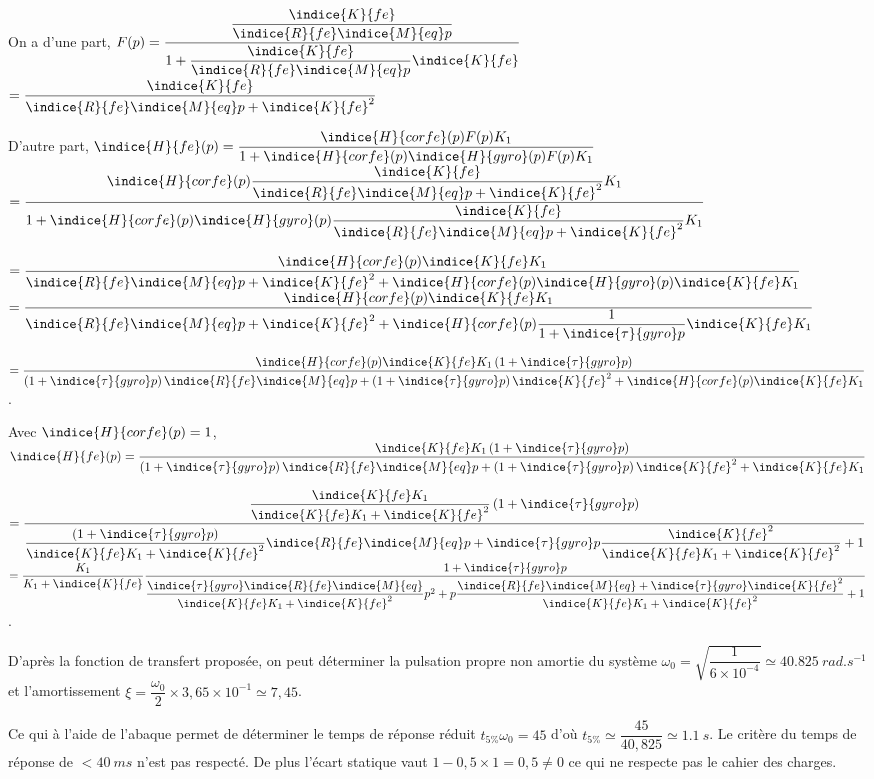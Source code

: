 \question{}
\ifprof
\begin{corrige}
On a d'une part, 
$F(p) = \dfrac{\dfrac{\indice{K}{fe}}{\indice{R}{fe}\indice{M}{eq}p}}{1+\dfrac{\indice{K}{fe}}{\indice{R}{fe}\indice{M}{eq}p}\indice{K}{fe}}$
$= \dfrac{\indice{K}{fe}}{\indice{R}{fe}\indice{M}{eq}p+ \indice{K}{fe}^2}$


D'autre part, 
$\indice{H}{fe} (p)= \dfrac{\indice{H}{corfe}(p) F(p) K_1 }{1+\indice{H}{corfe}(p)\indice{H}{gyro}(p) F(p) K_1 }$
$ = \dfrac{\indice{H}{corfe}(p) \dfrac{\indice{K}{fe}}{\indice{R}{fe}\indice{M}{eq}p+ \indice{K}{fe}^2} K_1 }{1+\indice{H}{corfe}(p)\indice{H}{gyro}(p) \dfrac{\indice{K}{fe}}{\indice{R}{fe}\indice{M}{eq}p+ \indice{K}{fe}^2} K_1 }$ 


$ = \dfrac{\indice{H}{corfe}(p) \indice{K}{fe} K_1 }{\indice{R}{fe}\indice{M}{eq}p+ \indice{K}{fe}^2+\indice{H}{corfe}(p)\indice{H}{gyro}(p) \indice{K}{fe} K_1} $ 
$ = \dfrac{\indice{H}{corfe}(p) \indice{K}{fe} K_1 }{\indice{R}{fe}\indice{M}{eq}p+ \indice{K}{fe}^2+\indice{H}{corfe}(p)\dfrac{1}{1+\indice{\tau}{gyro}p}\indice{K}{fe} K_1} $ 

$ = \dfrac{\indice{H}{corfe}(p) \indice{K}{fe} K_1 \left(1+\indice{\tau}{gyro}p\right)}{ \left(1+\indice{\tau}{gyro}p\right) \indice{R}{fe}\indice{M}{eq}p+  \left(1+\indice{\tau}{gyro}p\right) \indice{K}{fe}^2+\indice{H}{corfe}(p)\indice{K}{fe} K_1} $.

Avec $\indice{H}{corfe}(p) = 1$, 
$ \indice{H}{fe} (p) = \dfrac{ \indice{K}{fe} K_1 \left(1+\indice{\tau}{gyro}p\right)}{ \left(1+\indice{\tau}{gyro}p\right) \indice{R}{fe}\indice{M}{eq}p+  \left(1+\indice{\tau}{gyro}p\right) \indice{K}{fe}^2+\indice{K}{fe} K_1} $ 

$ = \dfrac{ \dfrac{\indice{K}{fe} K_1}{\indice{K}{fe} K_1+\indice{K}{fe}^2} \left(1+\indice{\tau}{gyro}p\right)}{ \dfrac{\left(1+\indice{\tau}{gyro}p\right)}{\indice{K}{fe} K_1+\indice{K}{fe}^2} \indice{R}{fe}\indice{M}{eq}p+  \indice{\tau}{gyro}p\dfrac{ \indice{K}{fe}^2}{\indice{K}{fe} K_1+\indice{K}{fe}^2}+1} $ 
$ = \dfrac{ K_1}{ K_1+\indice{K}{fe}} \dfrac{ 1+\indice{\tau}{gyro}p}{ \dfrac{\indice{\tau}{gyro} \indice{R}{fe}\indice{M}{eq} }{\indice{K}{fe} K_1+\indice{K}{fe}^2} p^2+  p\dfrac{ \indice{R}{fe}\indice{M}{eq}+\indice{\tau}{gyro}\indice{K}{fe}^2}{\indice{K}{fe} K_1+\indice{K}{fe}^2}+1} $. 

\end{corrige}

\else
\fi

\question{}
\ifprof
\begin{corrige}
D'après la fonction de transfert proposée, on peut déterminer la pulsation propre non amortie du 
système $\omega_0 = \sqrt{\dfrac{1}{6\times 10^{-4}}}\simeq \SI{40,825}{rad.s^{-1}}$
et l'amortissement $\xi=\dfrac{\omega_0}{2} \times 3,65 \times 10^{-1} \simeq 7,45$.

Ce qui à l'aide de l'abaque permet de déterminer le temps de réponse réduit $t_{5\%} \omega_0= 45$ 
d'où  $t_{5\%} \simeq \dfrac{45}{40,825}\simeq \SI{1,1}{s}$. Le critère du temps de réponse de $<\SI{40}{ms}$ n'est pas respecté. De plus 
l'écart statique vaut $1-0,5\times 1=0,5 \neq 0$ ce qui ne respecte pas le cahier des charges.
\end{corrige}
\else
\fi


